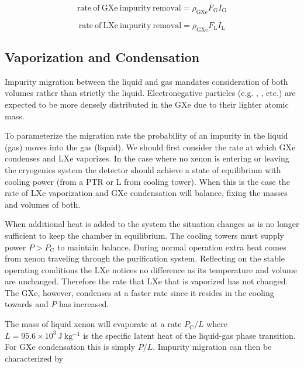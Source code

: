 \begin{equation}
\mathrm{rate\ of\ GXe\ impurity\ removal} = \rho_{\mathrm{GXe}} F_{\mathrm{G}} I_{\mathrm{G}}
\label{eq:electron_lifetime_model_removal_gxe}
\end{equation}

\begin{equation}
\mathrm{rate\ of\ LXe\ impurity\ removal} = \rho_{\mathrm{GXe}} F_{\mathrm{L}} I_{\mathrm{L}}
\label{eq:electron_lifetime_model_removal_lxe}
\end{equation}



\subsection{Vaporization and Condensation}
\label{subsec:electron_lifetime_model_vap_and_cond}
Impurity migration between the liquid and gas mandates consideration of both volumes rather than strictly the liquid.  Electronegative
particles (e.g. , , etc.) are expected to be more densely distributed in the GXe due to their lighter atomic mass.

To parameterize the migration rate the probability of an impurity in the liquid (gas) moves into the gas (liquid).  We should first
consider the rate at which GXe condenses and LXe vaporizes.  In the case where no xenon is entering or leaving the cryogenics system
 the detector
should achieve a state of equilibrium with cooling power \pc (from a PTR or L from cooling tower).  When this is the case the
rate of LXe vaporization and GXe condensation will balance, fixing the masses and volumes of both.

When additional heat is added to the system the situation changes as \pc is no longer sufficient to keep the chamber in
equilibrium.  The cooling towers must supply power $P > P_{\mathrm{C}}$ to maintain balance.  During normal operation extra heat comes
from xenon traveling through the purification system.  Reflecting on the stable operating conditions the LXe notices no difference as
its temperature and volume are unchanged.  Therefore the rate that LXe that is vaporized has not changed.  The GXe, however, condenses
at a faster rate since it resides in the cooling towards and $P$ has increased.

The mass of liquid xenon will evaporate at a rate $P_{\mathrm{C}} / L$ where $L = 95.6 \times 10^3\ \mathrm{J\ kg^{-1}}$ is the
specific latent heat of the liquid-gas phase transition.  For GXe condensation this is simply $P / L$.  Impurity migration can then be
characterized by

